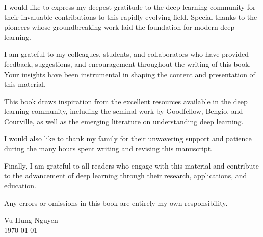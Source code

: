 I would like to express my deepest gratitude to the deep learning community for their invaluable contributions to this rapidly evolving field. Special thanks to the pioneers whose groundbreaking work laid the foundation for modern deep learning.

I am grateful to my colleagues, students, and collaborators who have provided feedback, suggestions, and encouragement throughout the writing of this book. Your insights have been instrumental in shaping the content and presentation of this material.

This book draws inspiration from the excellent resources available in the deep learning community, including the seminal work by Goodfellow, Bengio, and Courville, as well as the emerging literature on understanding deep learning.

I would also like to thank my family for their unwavering support and patience during the many hours spent writing and revising this manuscript.

Finally, I am grateful to all readers who engage with this material and contribute to the advancement of deep learning through their research, applications, and education.

Any errors or omissions in this book are entirely my own responsibility.

\vspace{1cm}
\noindent Vu Hung Nguyen\\
\today

